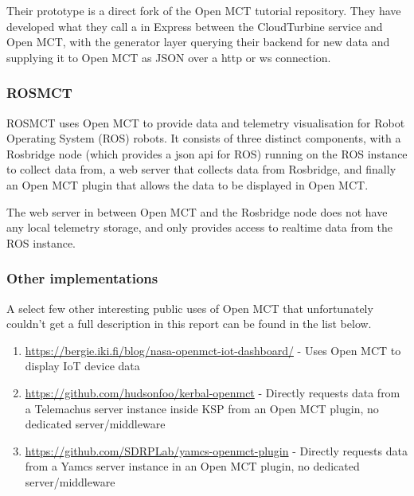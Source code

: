 Their prototype is a direct fork of the Open MCT tutorial repository. They have developed what they call a  in Express between the CloudTurbine service and Open MCT, with the generator layer querying their backend for new data and supplying it to Open MCT as JSON over a \acrshort{http} or \Gls{ws} connection. \cite{cloudturbine}

\subsubsection{ROSMCT}
ROSMCT uses Open MCT to provide data and telemetry visualisation for Robot Operating System (ROS) robots. It consists of three distinct components, with a Rosbridge node (which provides a \acrshort{json} \acrshort{api} for ROS) running on the ROS instance to collect data from, a web server that collects data from Rosbridge, and finally an Open MCT plugin that allows the data to be displayed in Open MCT.

The web server in between Open MCT and the Rosbridge node does not have any local telemetry storage, and only provides access to realtime data from the ROS instance. \cite{rosmct}

\subsubsection{Other implementations}
A select few other interesting public uses of Open MCT that unfortunately couldn't get a full description in this report can be found in the list below.

\begin{enumerate}
  \item \url{https://bergie.iki.fi/blog/nasa-openmct-iot-dashboard/} - Uses Open MCT to display IoT device data
  \item \url{https://github.com/hudsonfoo/kerbal-openmct} - Directly requests data from a Telemachus server instance inside KSP from an Open MCT plugin, no dedicated server/middleware
  \item \url{https://github.com/SDRPLab/yamcs-openmct-plugin} - Directly requests data from a Yamcs server instance in an Open MCT plugin, no dedicated server/middleware
\end{enumerate}